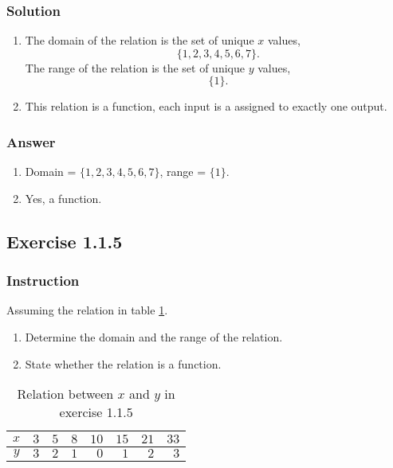 \documentclass[11pt, letterpaper, oneside]{memoir}
\begin{document}
\subsubsection{Solution}

\begin{enumerate}[label=(\alph*)]
  \item The domain of the relation is the set of unique $ x $ values,
    $$ \phantom{.}
    \{ 1, 2, 3, 4, 5, 6, 7 \}
    .$$
    The range of the relation is the set of unique $ y $ values,
    $$ \phantom{.}
    \{ 1 \}
    .$$
  \item This relation is a function, each input is a assigned to exactly one output.
\end{enumerate}

\subsubsection{Answer}

\begin{enumerate}[label=(\alph*)]
  \item Domain = $  \{ 1, 2, 3, 4, 5, 6, 7 \} $, range = $ \{ 1 \} $.
  \item Yes, a function.
\end{enumerate}

\subsection*{Exercise 1.1.5}

\subsubsection{Instruction}

Assuming the relation in table \ref{table:exercise-1.1.5}.

\begin{enumerate}[label=(\alph*)]
  \item Determine the domain and the range of the relation.
  \item State whether the relation is a function.
\end{enumerate}

\begin{table}[ht]
  \centering
  \begin{tabular}{ c | r r r r r r r }
    \hline
    $ x $ & $ 3 $ & $ 5 $ & $ 8 $ & $ 10 $ & $ 15 $ & $ 21 $ & $ 33 $ \\
    \hline
    $ y $ & $ 3 $ & $ 2 $ & $ 1 $ & $ 0 $ & $ 1 $ & $ 2 $ & $ 3 $ \\
    \hline
  \end{tabular}
  \caption{Relation between $ x $ and $ y $ in exercise 1.1.5}
  \label{table:exercise-1.1.5}
\end{table}
\end{document}
